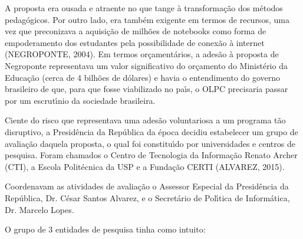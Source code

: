 \documentclass[
12pt,		%
openright,	%
twoside,  %
a4paper,			%
chapter=TITLE,		%
english,			%
french,				%
spanish,			%
brazil				%
]{USPSC-classe/USPSC}
\begin{document}
A proposta era ousada e atraente no que tange \`a transforma\c{c}\~ao dos m\'etodos pedag\'ogicos. Por outro lado, era tamb\'em exigente em termos de recursos, uma vez que preconizava a aquisi\c{c}\~ao de milh\~oes de notebooks como forma de empoderamento dos estudantes pela possibilidade de conex\~ao \`a internet  (NEGROPONTE, 2004). Em termos or\c{c}ament\'arios, a ades\~ao \`a proposta de Negroponte representava um valor significativo do or\c{c}amento do Minist\'erio da Educa\c{c}\~ao (cerca de 4 bilh\~oes de d\'olares) e havia o entendimento do governo brasileiro de que, para que fosse viabilizado no pa\'{\i}s, o OLPC precisaria passar por um escrut\'{\i}nio da sociedade brasileira.

















Ciente do risco que representava uma ades\~ao voluntariosa a um programa t\~ao disruptivo, a Presid\^encia da Rep\'ublica da \'epoca decidiu estabelecer um grupo de avalia\c{c}\~ao  daquela proposta, o  qual foi constitu\'{\i}do por universidades e centros de pesquisa. Foram chamados o Centro de Tecnologia da Informa\c{c}\~ao Renato Archer (CTI), a Escola Polit\'ecnica da USP e a Funda\c{c}\~ao CERTI (ALVAREZ, 2015).

















Coordenavam as atividades de avalia\c{c}\~ao o Assessor Especial da Presid\^encia da Rep\'ublica, Dr. C\'esar Santos Alvarez, e o Secret\'ario de Pol\'{\i}tica de Inform\'atica, Dr. Marcelo Lopes.

















O grupo de 3 entidades de pesquisa tinha como intuito:
\end{document}
